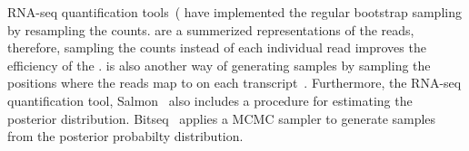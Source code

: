 RNA-seq quantification tools~(\citep{kallisto,salmon} have implemented the regular bootstrap 
sampling by resampling the \eqc counts. \eqcs are a summerized representations of the reads, 
therefore, sampling the \eqc counts instead of each individual read improves the efficiency 
of the \boots. \pboots is also another way of generating \boot samples by sampling the 
positions where the reads map to on each transcript~\citep{xiong2016probabilistic}.
Furthermore, the RNA-seq quantification tool, Salmon~\citep{salmon} also includes a \gibbs
procedure for estimating the posterior distribution.  Bitseq~\citep{glaus2012identifying} 
applies a MCMC \gib sampler to generate samples from the posterior probabilty distribution. 